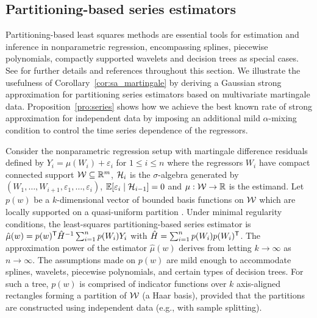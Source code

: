\subsection{Partitioning-based series estimators}
\label{sec:series}

Partitioning-based least squares methods are essential tools for estimation and
inference in nonparametric regression, encompassing splines, piecewise
polynomials, compactly supported wavelets and decision trees as special cases.
See \citet{cattaneo2020large} for further details and references throughout
this section. We illustrate the usefulness of Corollary~\ref{cor:sa_martingale}
by deriving a Gaussian strong approximation for partitioning series estimators
based on multivariate martingale data. Proposition~\ref{pro:series} shows how
we achieve the best known rate of strong approximation for independent data by
imposing an additional mild $\alpha$-mixing condition to control the time
series dependence of the regressors.

Consider the nonparametric regression setup with martingale difference
residuals defined by $Y_i = \mu(W_i) + \varepsilon_i$ for $ 1 \leq i \leq n$
where the regressors $W_i$ have compact connected support $\mathcal{W} \subseteq \mathbb{R}^m$,
$\mathcal{H}_i$ is the $\sigma$-algebra generated by
$(W_1, \ldots, W_{i+1}, \varepsilon_1, \ldots, \varepsilon_i)$,
$\mathbb{E}[\varepsilon_i \mid \mathcal{H}_{i-1}] = 0$ and $\mu: \mathcal{W} \to \mathbb{R}$ is the estimand.
Let $p(w)$ be a $k$-dimensional vector of bounded basis functions on $\mathcal{W}$
which are locally supported on a quasi-uniform partition
\citep[Assumption~2]{cattaneo2020large}. Under minimal regularity conditions,
the least-squares partitioning-based series estimator is
$\hat\mu(w) = p(w)^{\mathsf{T}} \hat H^{-1} \sum_{i=1}^n p(W_i) Y_i$
with $\hat H = \sum_{i=1}^n p(W_i) p(W_i)^{\mathsf{T}}$.
The approximation power of the estimator $\hat\mu(w)$ derives from letting
$k\to\infty$ as $n\to\infty$. The assumptions made on $p(w)$ are mild enough to
accommodate splines, wavelets, piecewise polynomials, and certain types of
decision trees. For such a tree, $p(w)$ is comprised of indicator functions
over $k$ axis-aligned rectangles forming a partition of $\mathcal{W}$ (a Haar basis),
provided that the partitions are constructed using independent data
(e.g., with sample splitting).

